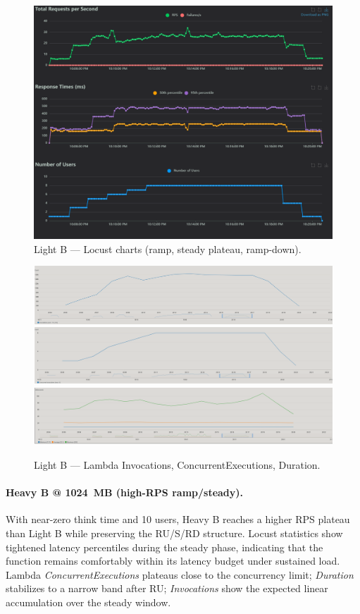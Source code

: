 \documentclass[11pt,a4paper]{article}
\begin{document}
\begin{figure}[h!] \centering
  \includegraphics[width=\linewidth]{"figures/lB - Charts.png"}
  \caption{Light B --- Locust charts (ramp, steady plateau, ramp-down).}
\end{figure}

\begin{figure}[h!] \centering
  \includegraphics[width=.32\linewidth]{"figures/lB - Invocations.png"}\hfill
  \includegraphics[width=.32\linewidth]{"figures/lB - ConcEx.png"}\hfill
  \includegraphics[width=.32\linewidth]{"figures/lB - Duration.png"}
  \caption{Light B --- Lambda Invocations, ConcurrentExecutions, Duration.}
\end{figure}

\paragraph{Heavy B @ \SI{1024}{MB} (high-RPS ramp/steady).}
With near-zero think time and 10 users, Heavy B reaches a higher RPS plateau than Light B while preserving the RU/S/RD structure. Locust statistics show tightened latency percentiles during the steady phase, indicating that the function remains comfortably within its latency budget under sustained load. Lambda \emph{ConcurrentExecutions} plateaus close to the concurrency limit; \emph{Duration} stabilizes to a narrow band after RU; \emph{Invocations} show the expected linear accumulation over the steady window.
\end{document}
